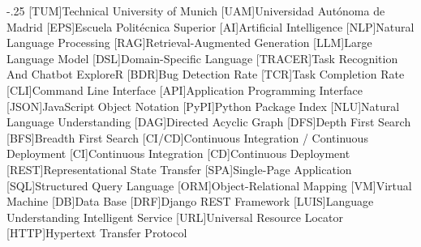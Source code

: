 \documentclass[headsepline,footsepline,footinclude=false,oneside,fontsize=11pt,paper=a4,listof=totoc,bibliography=totoc]{scrbook} %
\begin{document}

\frontmatter{}





\tableofcontents{}

\mainmatter{}









\appendix{}




\begin{acronym}
	\itemsep-.25\baselineskip
	[TUM]{Technical University of Munich}
  [UAM]{Universidad Autónoma de Madrid}
  [EPS]{Escuela Politécnica Superior}
  [AI]{Artificial Intelligence}
  [NLP]{Natural Language Processing}
  [RAG]{Retrieval-Augmented Generation}
  [LLM]{Large Language Model}
  [DSL]{Domain-Specific Language}
  [TRACER]{Task Recognition And Chatbot ExploreR}
  [BDR]{Bug Detection Rate}
  [TCR]{Task Completion Rate}
  [CLI]{Command Line Interface}
  [API]{Application Programming Interface}
  [JSON]{JavaScript Object Notation}
  [PyPI]{Python Package Index}
  [NLU]{Natural Language Understanding}
  [DAG]{Directed Acyclic Graph}
  [DFS]{Depth First Search}
  [BFS]{Breadth First Search}
  [CI/CD]{Continuous Integration / Continuous Deployment}
  [CI]{Continuous Integration}
  [CD]{Continuous Deployment}
  [REST]{Representational State Transfer}
  [SPA]{Single-Page Application}
  [SQL]{Structured Query Language}
  [ORM]{Object-Relational Mapping}
  [VM]{Virtual Machine}
  [DB]{Data Base}
  [DRF]{Django REST Framework}
  [LUIS]{Language Understanding Intelligent Service}
  [URL]{Universal Resource Locator}
  [HTTP]{Hypertext Transfer Protocol}
\end{acronym}

\listoffigures{}
\listoftables{}
\printbibliography{}
\end{document}
